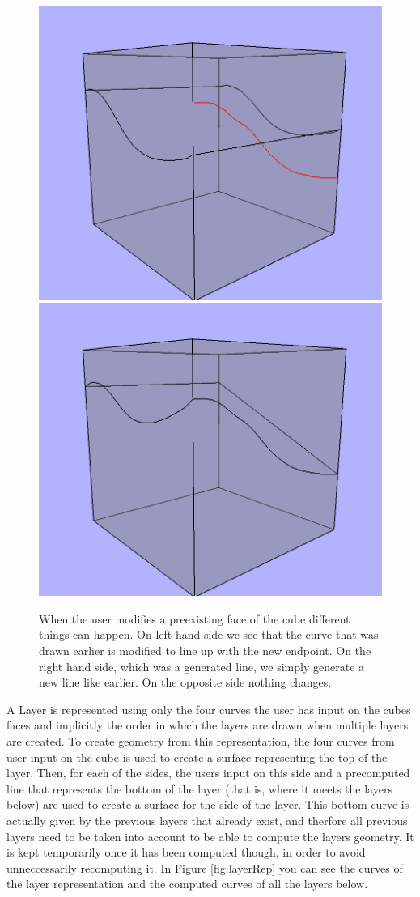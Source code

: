 \documentclass[a4paper,12pt]{report}
\begin{document}
\begin{figure}
\includegraphics[width=.5\linewidth]{thesis/modification1.png}
\includegraphics[width=.5\linewidth]{thesis/modification2.png}
 \caption{When the user modifies a preexisting face of the cube different things can happen. On left hand side we see that the curve that was drawn earlier is modified to line up with the new endpoint. On the right hand side, which was a generated line, we simply generate a new line like earlier. On the opposite side nothing changes.}
 \label{fig:layerModify}
\end{figure}

A Layer is represented using only the four curves the user has input on the cubes faces and implicitly the order in which the layers are drawn when multiple layers are created. To create geometry from this representation, the four curves from user input on the cube is used to create a surface representing the top of the layer. Then, for each of the sides, the users input on this side and a precomputed line that represents the bottom of the layer (that is, where it meets the layers below) are used to create a surface for the side of the layer. This bottom curve is actually given by the previous layers that already exist, and therfore all previous layers need to be taken into account to be able to compute the layers geometry. It is kept temporarily once it has been computed though, in order to avoid unneccessarily recomputing it. In Figure \ref{fig:layerRep} you can see the curves of the layer representation and the computed curves of all the layers below.
\end{document}
